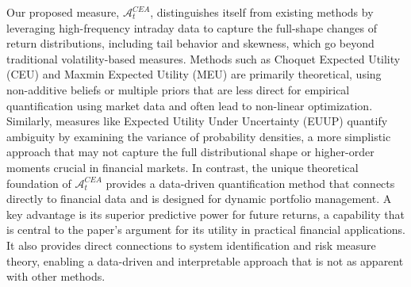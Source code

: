 \documentclass[preprint,12pt,authoryear]{elsarticle}
\begin{document}
Our proposed measure, $\mathcal{A}^{CEA}_t$, distinguishes itself from existing methods by leveraging high-frequency intraday data to capture the full-shape changes of return distributions, including tail behavior and skewness, which go beyond traditional volatility-based measures. Methods such as Choquet Expected Utility (CEU)  and Maxmin Expected Utility (MEU)  are primarily theoretical, using non-additive beliefs or multiple priors that are less direct for empirical quantification using market data and often lead to non-linear optimization. Similarly, measures like Expected Utility Under Uncertainty (EUUP)  quantify ambiguity by examining the variance of probability densities, a more simplistic approach that may not capture the full distributional shape or higher-order moments crucial in financial markets. In contrast, the unique theoretical foundation of $\mathcal{A}^{CEA}_t$ provides a data-driven quantification method that connects directly to financial data and is designed for dynamic portfolio management. A key advantage is its superior predictive power for future returns, a capability that is central to the paper's argument for its utility in practical financial applications. It also provides direct connections to system identification and risk measure theory, enabling a data-driven and interpretable approach that is not as apparent with other methods.
\end{document}
